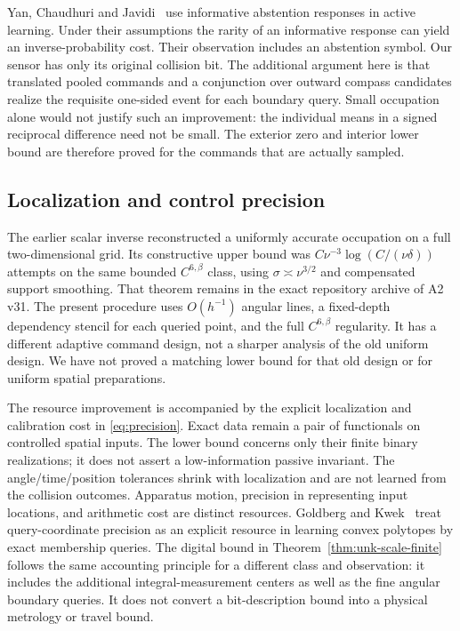 Yan, Chaudhuri and Javidi~\cite{YCJ} use informative abstention
responses in active learning. Under their assumptions the rarity of
an informative response can yield an inverse-probability cost. Their
observation includes an abstention symbol. Our sensor has only its
original collision bit. The additional argument here is that translated
pooled commands and a conjunction over outward compass candidates
realize the requisite one-sided event for each boundary query. Small
occupation alone would not justify such an improvement: the individual
means in a signed reciprocal difference need not be small. The exterior
zero and interior lower bound are therefore proved for the commands
that are actually sampled.

\subsection{Localization and control precision}

The earlier scalar inverse reconstructed a uniformly accurate occupation
on a full two-dimensional grid. Its constructive upper bound was
$C\nu^{-3}\log(C/(\nu\delta))$ attempts on the same bounded
$C^{6,\beta}$ class, using $\sigma\asymp\nu^{3/2}$ and compensated
support smoothing. That theorem remains in the exact repository archive of A2 v31. The present
procedure uses $O(h^{-1})$ angular lines, a fixed-depth dependency
stencil for each queried point, and the full $C^{6,\beta}$ regularity.
It has a different adaptive command design, not a sharper analysis of
the old uniform design. We have not proved a matching lower bound
for that old design or for uniform spatial preparations.

The resource improvement is accompanied by the explicit localization
and calibration cost in \eqref{eq:precision}. Exact data remain a pair
of functionals on controlled spatial inputs. The lower bound concerns
only their finite binary realizations; it does not assert a low-information
passive invariant. The angle/time/position tolerances shrink with
localization and are not learned from the collision outcomes. Apparatus
motion, precision in representing input locations, and arithmetic
cost are distinct resources. Goldberg and Kwek~\cite{GK} treat
query-coordinate precision as an explicit resource in learning convex
polytopes by exact membership queries. The digital bound in
Theorem~\ref{thm:unk-scale-finite} follows the same accounting principle
for a different class and observation: it includes the additional
integral-measurement centers as well as the fine angular boundary
queries. It does not convert a bit-description bound into a physical
metrology or travel bound.

